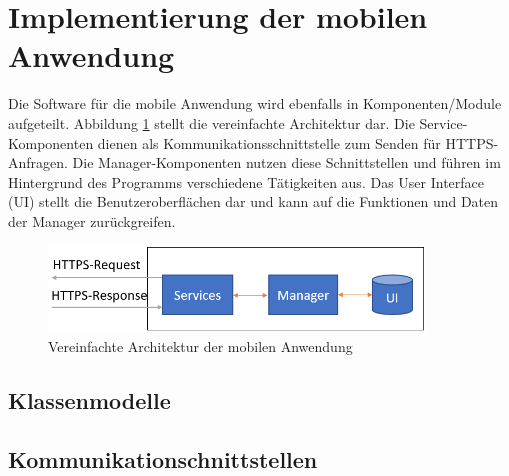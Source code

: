 \documentclass[11pt,a4paper]{article}
\begin{document}
\section{Implementierung der mobilen Anwendung}
Die Software für die mobile Anwendung wird ebenfalls in Komponenten/Module aufgeteilt. Abbildung \ref{fig:AppArchitektur} stellt die vereinfachte Architektur dar. Die Service-Komponenten dienen als Kommunikationsschnittstelle zum Senden für HTTPS-Anfragen. Die  Manager-Komponenten nutzen diese Schnittstellen und führen im Hintergrund des Programms verschiedene Tätigkeiten aus. Das User Interface (UI) stellt die Benutzeroberflächen dar und kann auf die Funktionen und Daten der Manager zurückgreifen.
\begin{figure}[tbt]
\centering
\includegraphics[width=10cm]{images/AppBackend.PNG}
\caption{Vereinfachte Architektur der mobilen Anwendung}
\label{fig:AppArchitektur}
\end{figure}


\subsection{Klassenmodelle}		

\subsection{Kommunikationschnittstellen}
	
\end{document}
